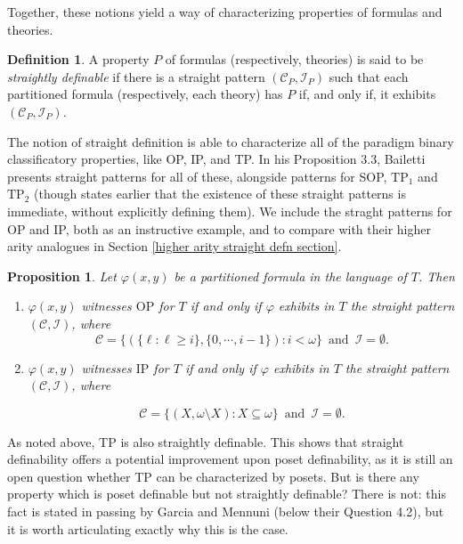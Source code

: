 \documentclass{article}
\newcommand{\calC}{\mathcal{C}}
\newcommand{\calI}{\mathcal{I}}
\newcommand{\TPi}{\text{TP}_1}
\newcommand{\TPii}{\text{TP}_2}
\newcommand{\vphi}{\varphi}
\newtheorem{proposition}{Proposition}
\theoremstyle{definition}
\newtheorem{definition}{Definition}
\theoremstyle{definition}
\theoremstyle{definition}
\begin{document}
Together, these notions yield a way of characterizing properties of formulas and theories.

\begin{definition}\label{straightly definable property}
    A property $P$ of formulas (respectively, theories) is said to be \textit{straightly definable} if there is a straight pattern $(\calC_P,\calI_P)$ such that each partitioned formula (respectively, each theory) has $P$ if, and only if, it exhibits $(\calC_P,\calI_P)$.
\end{definition}

The notion of straight definition is able to characterize all of the paradigm binary classificatory properties, like OP, IP, and TP. In his Proposition 3.3, Bailetti presents straight patterns for all of these, alongside patterns for SOP, $\TPi$ and $\TPii$ (though \cite{shelah_what_2000} states earlier that the existence of these straight patterns is immediate, without explicitly defining them). We include the straght patterns for OP and IP, both as an instructive example, and to compare with their higher arity analogues in Section \ref{higher arity straight defn section}.

\begin{proposition}\label{straight pattern examples proposition}
    Let $\vphi(x,y)$ be a partitioned formula in the language of $T$. Then
    \begin{enumerate}
        \item $\vphi(x,y)$ witnesses $\mathrm{OP}$ for $T$ if and only if $\vphi$ exhibits in $T$ the straight pattern $(\calC,\calI)$, where  
        \[\calC=\{(\{\ell\colon \ell\geq i\},\{0,\dotsm, i-1\})\colon i<\omega\}\enspace\text{and}\enspace \calI=\emptyset.\]

        \item $\vphi(x,y)$ witnesses $\mathrm{IP}$ for $T$ if and only if $\vphi$ exhibits in $T$ the straight pattern $(\calC,\calI)$, where  
        
        \[\calC=\{(X,\omega\setminus X)\colon X\subseteq \omega\}\enspace\text{and}\enspace\calI=\emptyset.\]
        
    \end{enumerate}
\end{proposition}


As noted above, TP is also straightly definable. This shows that  straight definability offers a potential improvement upon poset definability, as it is still an open question whether TP can be characterized by posets. But is there any property which is poset definable but not straightly definable? There is not: this fact is stated in passing by Garcia and Mennuni (below their Question 4.2), but it is worth articulating exactly why this is the case.
\end{document}
